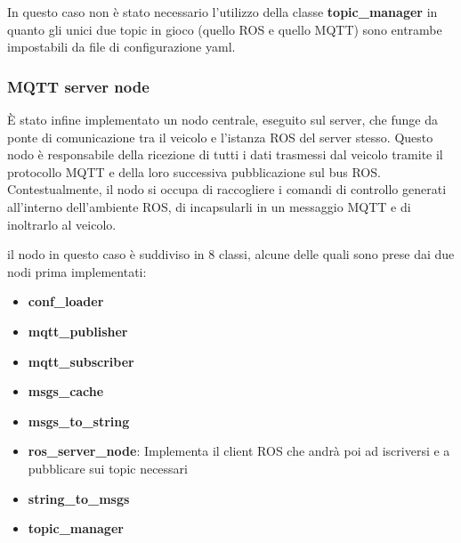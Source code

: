 \noindent In questo caso non è stato necessario l'utilizzo della classe \textbf{topic\_manager} in quanto gli unici due topic in gioco (quello ROS e quello MQTT) sono entrambe impostabili da file di configurazione yaml.

\subsubsection{MQTT server node}
È stato infine implementato un nodo centrale, eseguito sul server, che funge da ponte di comunicazione tra il veicolo e l'istanza ROS del server stesso. Questo nodo è responsabile della ricezione di tutti i dati trasmessi dal veicolo tramite il protocollo MQTT e della loro successiva pubblicazione sul bus ROS. Contestualmente, il nodo si occupa di raccogliere i comandi di controllo generati all'interno dell'ambiente ROS, di incapsularli in un messaggio MQTT e di inoltrarlo al veicolo.

\noindent il nodo in questo caso è suddiviso in 8 classi, alcune delle quali sono prese dai due nodi prima implementati:

\begin{itemize}
  \item \textbf{conf\_loader}
  \item \textbf{mqtt\_publisher}
  \item \textbf{mqtt\_subscriber}
  \item \textbf{msgs\_cache}
  \item \textbf{msgs\_to\_string}
  \item \textbf{ros\_server\_node}: Implementa il client ROS che andrà poi ad iscriversi e a pubblicare sui topic necessari
  \item \textbf{string\_to\_msgs}
  \item \textbf{topic\_manager}
\end{itemize}
